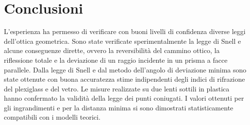 \section{Conclusioni}
L'esperienza ha permesso di verificare con buoni livelli di confidenza diverse leggi dell'ottica geometrica. Sono state verificate sperimentalmente la legge di Snell e alcune conseguenze dirette, ovvero la reversibilità del cammino ottico, la riflessione totale e la deviazione di un raggio incidente in un prisma a facce parallele. Dalla legge di Snell e dal metodo dell'angolo di deviazione minima sono state ottenute con buona accuratezza stime indipendenti degli indici di rifrazione del plexiglass e del vetro. Le misure realizzate su due lenti sottili in plastica hanno confermato la validità della legge dei punti coniugati. I valori ottenuti per gli ingrandimenti e per la distanza minima si sono dimostrati statisticamente compatibili con i modelli teorici.
\newpage